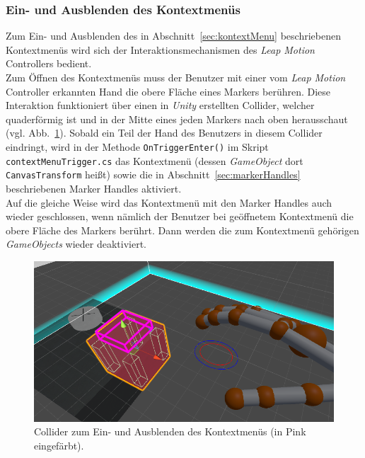 \subsubsection{Ein- und Ausblenden des Kontextmenüs} \label{sec:KontextMenuSwitch}
Zum Ein- und Ausblenden des in Abschnitt~\ref{sec:kontextMenu} beschriebenen Kontextmenüs wird sich der Interaktionsmechanismen des \emph{Leap Motion} Controllers bedient.\\
Zum Öffnen des Kontextmenüs muss der Benutzer mit einer vom \emph{Leap Motion} Controller erkannten Hand die obere Fläche eines Markers berühren. Diese Interaktion funktioniert über einen in \emph{Unity} erstellten Collider, welcher quaderförmig ist und in der Mitte eines jeden Markers nach oben herausschaut (vgl. Abb.~\ref{fig:KontextmenuCollider}). Sobald ein Teil der Hand des Benutzers in diesem Collider eindringt, wird in der Methode \texttt{OnTriggerEnter()} im Skript \texttt{contextMenuTrigger.cs} das Kontextmenü (dessen \emph{GameObject} dort \texttt{CanvasTransform} heißt) sowie die in Abschnitt~\ref{sec:markerHandles} beschriebenen Marker Handles aktiviert.\\
Auf die gleiche Weise wird das Kontextmenü mit den Marker Handles auch wieder geschlossen, wenn nämlich der Benutzer bei geöffnetem Kontextmenü die obere Fläche des Markers berührt. Dann werden die zum Kontextmenü gehörigen \emph{GameObjects} wieder deaktiviert.

\begin{figure}
	\centering
	\includegraphics[width=\textwidth]{Bilder/Contextmenu_Collider}
	\caption{Collider zum Ein- und Ausblenden des Kontextmenüs (in Pink eingefärbt).}
	\label{fig:KontextmenuCollider}
\end{figure}

